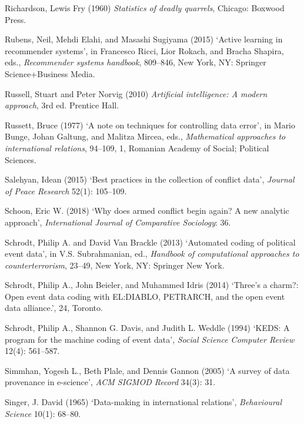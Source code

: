 \documentclass[12pt,twoside]{reedthesis}
\begin{document}
\hypertarget{ref-richardson_statistics_1960}{}
Richardson, Lewis Fry (1960) \emph{Statistics of deadly quarrels},
Chicago: Boxwood Press.

\hypertarget{ref-rubens_active_2015}{}
Rubens, Neil, Mehdi Elahi, and Masashi Sugiyama (2015) `Active learning
in recommender systems', in Francesco Ricci, Lior Rokach, and Bracha
Shapira, eds., \emph{Recommender systems handbook}, 809--846, New York,
NY: Springer Science+Business Media.

\hypertarget{ref-russell_artificial_2010}{}
Russell, Stuart and Peter Norvig (2010) \emph{Artificial intelligence: A
modern approach}, 3rd ed. Prentice Hall.

\hypertarget{ref-russett_note_1977}{}
Russett, Bruce (1977) `A note on techniques for controlling data error',
in Mario Bunge, Johan Galtung, and Malitza Mircea, eds.,
\emph{Mathematical approaches to international relations}, 94--109, 1,
Romanian Academy of Social; Political Sciences.

\hypertarget{ref-salehyan_best_2015}{}
Salehyan, Idean (2015) `Best practices in the collection of conflict
data', \emph{Journal of Peace Research} 52(1): 105--109.

\hypertarget{ref-schoon_why_2018}{}
Schoon, Eric W. (2018) `Why does armed conflict begin again? A new
analytic approach', \emph{International Journal of Comparative
Sociology}: 36.

\hypertarget{ref-schrodt_automated_2013}{}
Schrodt, Philip A. and David Van Brackle (2013) `Automated coding of
political event data', in V.S. Subrahmanian, ed., \emph{Handbook of
computational approaches to counterterrorism}, 23--49, New York, NY:
Springer New York.

\hypertarget{ref-schrodt_threes_2014}{}
Schrodt, Philip A., John Beieler, and Muhammed Idris (2014) `Three's a
charm?: Open event data coding with EL:DIABLO, PETRARCH, and the open
event data alliance.', 24, Toronto.

\hypertarget{ref-schrodt_keds:_1994}{}
Schrodt, Philip A., Shannon G. Davis, and Judith L. Weddle (1994) `KEDS:
A program for the machine coding of event data', \emph{Social Science
Computer Review} 12(4): 561--587.

\hypertarget{ref-simmhan_survey_2005}{}
Simmhan, Yogesh L., Beth Plale, and Dennis Gannon (2005) `A survey of
data provenance in e-science', \emph{ACM SIGMOD Record} 34(3): 31.

\hypertarget{ref-singer_data-making_1965}{}
Singer, J. David (1965) `Data-making in international relations',
\emph{Behavioural Science} 10(1): 68--80.
\end{document}
